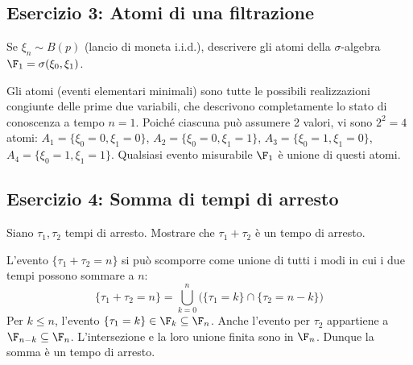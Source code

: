 \subsection*{Esercizio 3: Atomi di una filtrazione}
Se $\xi_n \sim B(p)$ (lancio di moneta i.i.d.), descrivere gli atomi della $\sigma$-algebra $\F_1 = \sigma(\xi_0, \xi_1)$.
\begin{spiegazione}
Gli atomi (eventi elementari minimali) sono tutte le possibili realizzazioni congiunte delle prime due variabili, che descrivono completamente lo stato di conoscenza a tempo $n=1$. Poiché ciascuna può assumere 2 valori, vi sono $2^2 = 4$ atomi:
$A_1 = \{\xi_0=0, \xi_1=0\}$, $A_2 = \{\xi_0=0, \xi_1=1\}$, $A_3 = \{\xi_0=1, \xi_1=0\}$, $A_4 = \{\xi_0=1, \xi_1=1\}$.
Qualsiasi evento misurabile $\F_1$ è unione di questi atomi.
\end{spiegazione}

\subsection*{Esercizio 4: Somma di tempi di arresto}
Siano $\tau_1, \tau_2$ tempi di arresto. Mostrare che $\tau_1 + \tau_2$ è un tempo di arresto.
\begin{spiegazione}
L'evento $\{\tau_1 + \tau_2 = n\}$ si può scomporre come unione di tutti i modi in cui i due tempi possono sommare a $n$:
\[ \{\tau_1 + \tau_2 = n\} = \bigcup_{k=0}^n \big(\{\tau_1 = k\} \cap \{\tau_2 = n-k\}\big) \]
Per $k \le n$, l'evento $\{\tau_1 = k\} \in \F_k \subseteq \F_n$. Anche l'evento per $\tau_2$ appartiene a $\F_{n-k} \subseteq \F_n$. L'intersezione e la loro unione finita sono in $\F_n$. Dunque la somma è un tempo di arresto.
\end{spiegazione}
